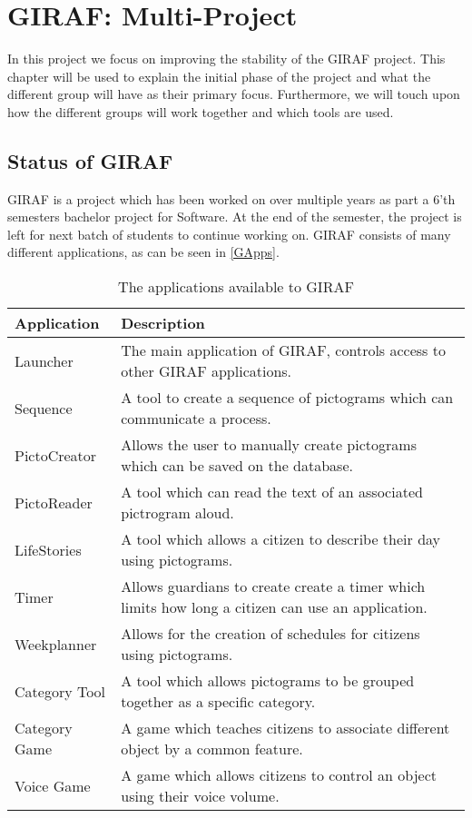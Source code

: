 \chapter{GIRAF: Multi-Project}

In this project we focus on improving the stability of the GIRAF project. This
chapter will be used to explain the initial phase of the project and what the
different group will have as their primary focus. Furthermore, we will touch
upon how the different groups will work together and which tools are used.


\section{Status of GIRAF}
GIRAF is a project which has been worked on over multiple years as part a
6'th semesters bachelor project for Software. At the end of the semester, the
project is left for next batch of students to continue working on. GIRAF
consists of many different applications, as can be seen in \autoref{GApps}.
\begin{table}[H]
\centering
\label{GApps}
\begin{tabular}{|p{3cm}|p{9cm}|}
\hline
Application			& Description \\\hline
Launcher  			& The main application of GIRAF, controls access to other
GIRAF applications. \\\hline 
Sequence	       	& A tool to create a sequence of pictograms which can
communicate a process.\\\hline 
PictoCreator  	   	& Allows the user to manually create pictograms which can be
saved on the database.\\\hline
PictoReader	   		& A tool which can read the text of an associated pictrogram
aloud.\\\hline
LifeStories	   		& A tool which allows a citizen to describe their day using
pictograms.\\\hline 
Timer     	   		& Allows guardians to create create a timer which limits how
long a citizen can use an application.\\\hline 
Weekplanner 		& Allows for the creation of schedules for citizens
using pictograms. \\\hline 
Category Tool		& A tool which allows pictograms to be grouped together as a
specific category. \\\hline 
Category Game   	& A game which teaches citizens to associate different object
by a common feature. \\\hline 
Voice Game  		& A game which allows citizens to control an object using their
voice volume. \\\hline
\end{tabular}
\caption{The applications available to GIRAF}
\end{table}

